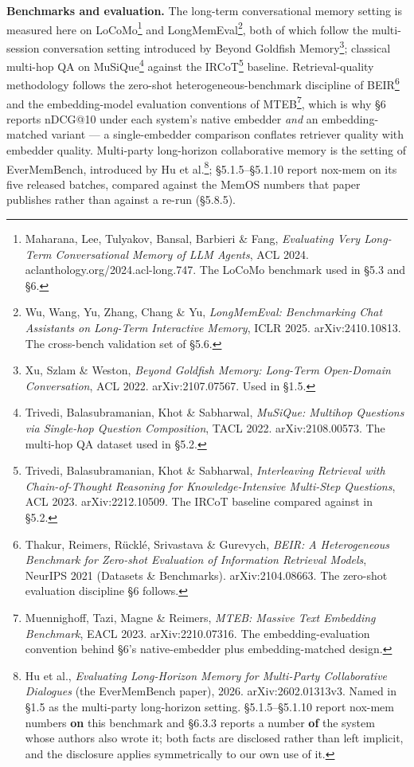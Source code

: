 \documentclass[
]{article}
\begin{document}
\textbf{Benchmarks and evaluation.} The long-term conversational memory
setting is measured here on LoCoMo\footnote{Maharana, Lee, Tulyakov,
  Bansal, Barbieri \& Fang, \emph{Evaluating Very Long-Term
  Conversational Memory of LLM Agents}, ACL 2024.
  aclanthology.org/2024.acl-long.747. The LoCoMo benchmark used in §5.3
  and §6.} and LongMemEval\footnote{Wu, Wang, Yu, Zhang, Chang \& Yu,
  \emph{LongMemEval: Benchmarking Chat Assistants on Long-Term
  Interactive Memory}, ICLR 2025. arXiv:2410.10813. The cross-bench
  validation set of §5.6.}, both of which follow the multi-session
conversation setting introduced by Beyond Goldfish Memory\footnote{Xu,
  Szlam \& Weston, \emph{Beyond Goldfish Memory: Long-Term Open-Domain
  Conversation}, ACL 2022. arXiv:2107.07567. Used in §1.5.}; classical
multi-hop QA on MuSiQue\footnote{Trivedi, Balasubramanian, Khot \&
  Sabharwal, \emph{MuSiQue: Multihop Questions via Single-hop Question
  Composition}, TACL 2022. arXiv:2108.00573. The multi-hop QA dataset
  used in §5.2.} against the IRCoT\footnote{Trivedi, Balasubramanian,
  Khot \& Sabharwal, \emph{Interleaving Retrieval with Chain-of-Thought
  Reasoning for Knowledge-Intensive Multi-Step Questions}, ACL 2023.
  arXiv:2212.10509. The IRCoT baseline compared against in §5.2.}
baseline. Retrieval-quality methodology follows the zero-shot
heterogeneous-benchmark discipline of BEIR\footnote{Thakur, Reimers,
  Rücklé, Srivastava \& Gurevych, \emph{BEIR: A Heterogeneous Benchmark
  for Zero-shot Evaluation of Information Retrieval Models}, NeurIPS
  2021 (Datasets \& Benchmarks). arXiv:2104.08663. The zero-shot
  evaluation discipline §6 follows.} and the embedding-model evaluation
conventions of MTEB\footnote{Muennighoff, Tazi, Magne \& Reimers,
  \emph{MTEB: Massive Text Embedding Benchmark}, EACL 2023.
  arXiv:2210.07316. The embedding-evaluation convention behind §6's
  native-embedder plus embedding-matched design.}, which is why §6
reports nDCG@10 under each system's native embedder \emph{and} an
embedding-matched variant --- a single-embedder comparison conflates
retriever quality with embedder quality. Multi-party long-horizon
collaborative memory is the setting of EverMemBench, introduced by Hu et
al.\footnote{Hu et al., \emph{Evaluating Long-Horizon Memory for
  Multi-Party Collaborative Dialogues} (the EverMemBench paper), 2026.
  arXiv:2602.01313v3. Named in §1.5 as the multi-party long-horizon
  setting. §5.1.5--§5.1.10 report nox-mem numbers \textbf{on} this
  benchmark and §6.3.3 reports a number \textbf{of} the system whose
  authors also wrote it; both facts are disclosed rather than left
  implicit, and the disclosure applies symmetrically to our own use of
  it.}; §5.1.5--§5.1.10 report nox-mem on its five released batches,
compared against the MemOS numbers that paper publishes rather than
against a re-run (§5.8.5).
\end{document}
